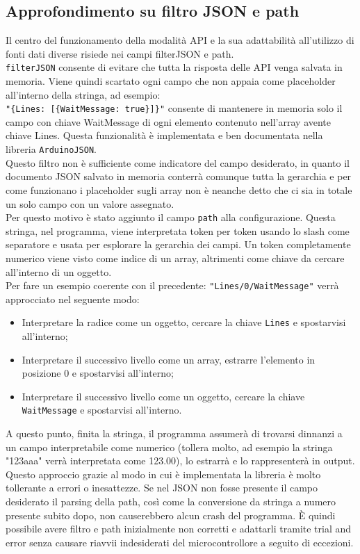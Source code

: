 \documentclass[12pt,a4paper]{report}
\begin{document}
\subsection{Approfondimento su filtro JSON e path} %
Il centro del funzionamento della modalità API e la sua adattabilità all'utilizzo di fonti dati diverse risiede nei campi
filterJSON e path.\\
\texttt{filterJSON} consente di evitare che tutta la risposta delle API venga salvata in memoria. Viene quindi scartato ogni campo che non
appaia come placeholder all'interno della stringa, ad esempio:\\
\texttt{"\{Lines: [\{WaitMessage: true\}]\}"} consente di mantenere
in memoria solo il campo con chiave WaitMessage di ogni elemento contenuto nell'array avente chiave Lines. Questa funzionalità è
implementata e ben documentata nella libreria \texttt{ArduinoJSON}.~\cite{arduinojsonfiltering} \\
Questo filtro non è sufficiente come indicatore del campo desiderato, in quanto il documento JSON salvato in memoria conterrà comunque
tutta la gerarchia e per come funzionano i placeholder sugli array non è neanche detto che ci sia in totale un solo campo con un valore
assegnato.\\
Per questo motivo è stato aggiunto il campo \texttt{path} alla configurazione. Questa stringa, nel programma, viene interpretata token per
token usando lo slash come separatore e usata per esplorare la gerarchia dei campi. Un token completamente numerico viene visto come
indice di un array, altrimenti come chiave da cercare all'interno di un oggetto.\\
Per fare un esempio coerente con il precedente: \texttt{"Lines/0/WaitMessage"} verrà approcciato nel seguente modo:
\begin{itemize}
  \item Interpretare la radice come un oggetto, cercare la chiave \texttt{Lines} e spostarvisi all'interno;
  \item Interpretare il successivo livello come un array, estrarre l'elemento in posizione 0 e spostarvisi all'interno;
  \item Interpretare il successivo livello come un oggetto, cercare la chiave \texttt{WaitMessage} e spostarvisi all'interno.
\end{itemize}
A questo punto, finita la stringa, il programma assumerà di trovarsi dinnanzi a un campo interpretabile come numerico (tollera molto,
ad esempio la stringa "123aaa" verrà interpretata come 123.00), lo estrarrà e lo rappresenterà in output.\\ %
Questo approccio grazie al modo in cui è implementata la libreria è molto tollerante a errori o inesattezze. Se nel JSON non fosse
presente il campo desiderato il parsing della path, così come la conversione da stringa a numero presente subito dopo, non causerebbero
alcun crash del programma. È quindi possibile avere filtro e path inizialmente non corretti e adattarli tramite trial and error senza
causare riavvii indesiderati del microcontrollore a seguito di eccezioni.
\end{document}
